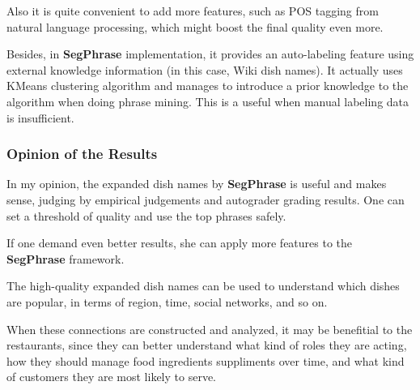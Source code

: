 \documentclass[11pt]{article}
\begin{document}
Also it is quite convenient to add more features, such as POS tagging from natural language processing, which might boost the final quality even more.

Besides, in \textbf{SegPhrase} implementation, it provides an auto-labeling feature using external knowledge information (in this case, Wiki dish names).
It actually uses KMeans clustering algorithm and manages to introduce a prior knowledge to the algorithm when doing phrase mining.
This is a useful when manual labeling data is insufficient.

\subsubsection{Opinion of the Results}
In my opinion, the expanded dish names by \textbf{SegPhrase} is useful and makes sense, judging by empirical judgements and autograder grading results. One can set a threshold of quality and use the top phrases safely.

If one demand even better results, she can apply more features to the \textbf{SegPhrase} framework.

The high-quality expanded dish names can be used to understand which dishes are popular, in terms of region, time, social networks, and so on.

When these connections are constructed and analyzed, it may be benefitial to the restaurants, since they can better understand what kind of roles they are acting, how they should manage food ingredients suppliments over time, and what kind of customers they are most likely to serve.
\end{document}
